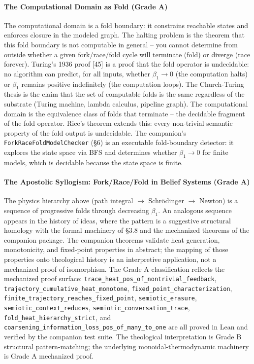 \documentclass[
  11pt,
]{article}
\begin{document}
\paragraph{The Computational Domain as Fold (Grade
A)}\label{the-computational-domain-as-fold-grade-a}

The computational domain is a fold boundary: it constrains reachable
states and enforces closure in the modeled graph. The halting problem is
the theorem that this fold boundary is not computable in general -- you
cannot determine from outside whether a given fork/race/fold cycle will
terminate (fold) or diverge (race forever). Turing's 1936 proof {[}45{]}
is a proof that the fold operator is undecidable: no algorithm can
predict, for all inputs, whether \(\beta_1 \to 0\) (the computation
halts) or \(\beta_1\) remains positive indefinitely (the computation
loops). The Church-Turing thesis is the claim that the set of computable
folds is the same regardless of the substrate (Turing machine, lambda
calculus, pipeline graph). The computational domain is the equivalence
class of folds that terminate -- the decidable fragment of the fold
operator. Rice's theorem extends this: every non-trivial semantic
property of the fold output is undecidable. The companion's
\texttt{ForkRaceFoldModelChecker} (§6) is an executable fold-boundary
detector: it explores the state space via BFS and determines whether
\(\beta_1 \to 0\) for finite models, which is decidable because the
state space is finite.

\paragraph{The Apostolic Syllogism: Fork/Race/Fold in Belief Systems
(Grade
A)}\label{the-apostolic-syllogism-forkracefold-in-belief-systems-grade-a}

The physics hierarchy above (path integral \(\to\) Schrödinger \(\to\)
Newton) is a sequence of progressive folds through decreasing
\(\beta_1\). An analogous sequence appears in the history of ideas,
where the pattern is a suggestive structural homology with the formal
machinery of §3.8 and the mechanized theorems of the companion package.
The companion theorems validate heat generation, monotonicity, and
fixed-point properties in abstract; the mapping of those properties onto
theological history is an interpretive application, not a mechanized
proof of isomorphism. The Grade A classification reflects the mechanized
proof surface: \texttt{trace\_heat\_pos\_of\_nontrivial\_feedback},
\texttt{trajectory\_cumulative\_heat\_monotone},
\texttt{fixed\_point\_characterization},
\texttt{finite\_trajectory\_reaches\_fixed\_point},
\texttt{semiotic\_erasure}, \texttt{semiotic\_context\_reduces},
\texttt{semiotic\_conversation\_trace},
\texttt{fold\_heat\_hierarchy\_strict}, and
\texttt{coarsening\_information\_loss\_pos\_of\_many\_to\_one} are all
proved in Lean and verified by the companion test suite. The theological
interpretation is Grade B structural pattern-matching; the underlying
monoidal-thermodynamic machinery is Grade A mechanized proof.
\end{document}
